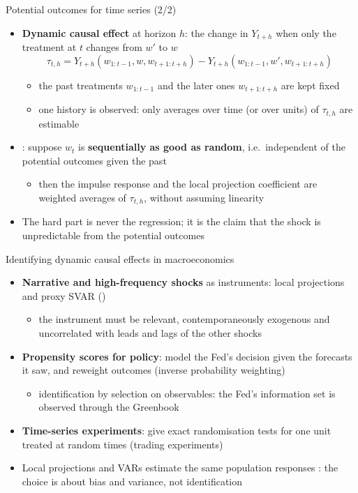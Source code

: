 \begin{frame}{Potential outcomes for time series (2/2)}
\itemsize{\small}
\begin{itemize}
    \item \textbf{Dynamic causal effect} at horizon $h$: the change in $Y_{t+h}$ when only the treatment at $t$ changes from $w'$ to $w$ \[ \tau_{t,h} = Y_{t+h}(w_{1:t-1}, w, w_{t+1:t+h}) - Y_{t+h}(w_{1:t-1}, w', w_{t+1:t+h}) \]
    \begin{itemize}
        \item the past treatments $w_{1:t-1}$ and the later ones $w_{t+1:t+h}$ are kept fixed
        \item one history is observed: only averages over time (or over units) of $\tau_{t,h}$ are estimable
    \end{itemize}
    \item {}: suppose $w_t$ is \textbf{sequentially as good as random}, i.e.\ independent of the potential outcomes given the past
    \begin{itemize}
        \item then the impulse response and the local projection coefficient are weighted averages of $\tau_{t,h}$, without assuming linearity
    \end{itemize}
    \item The hard part is never the regression; it is the claim that the shock is unpredictable from the potential outcomes
\end{itemize}
\end{frame}

\begin{frame}{Identifying dynamic causal effects in macroeconomics}
\itemsize{\small}
\begin{itemize}
    \item \textbf{Narrative and high-frequency shocks} as instruments: local projections  and proxy SVAR  ()
    \begin{itemize}
        \item the instrument must be relevant, contemporaneously exogenous and uncorrelated with leads and lags of the other shocks 
    \end{itemize}
    \item \textbf{Propensity scores for policy}:  model the Fed's decision given the forecasts it saw, and reweight outcomes (inverse probability weighting)
    \begin{itemize}
        \item identification by selection on observables: the Fed's information set is observed through the Greenbook
    \end{itemize}
    \item \textbf{Time-series experiments}:  give exact randomisation tests for one unit treated at random times (trading experiments)
    \item Local projections and VARs estimate the same population responses : the choice is about bias and variance, not identification
\end{itemize}
\end{frame}

